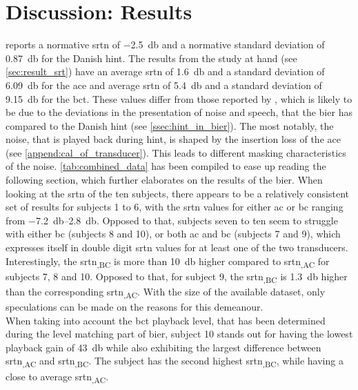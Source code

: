 \section{Discussion: Results}\label{sec:disc_res}
\citep{hint_2011} reports a normative \gls{srtn} of \SI{-2.5}{\decibel} and a normative standard deviation of \SI{0.87}{\decibel} for the Danish \gls{hint}. The results from the study at hand (see \autoref{sec:result_srt}) have an average \gls{srtn} of \SI{1.6}{\decibel} and a standard deviation of \SI{6.09}{\decibel} for the \gls{ace} and average \gls{srtn} of \SI{5.4}{\decibel} and a standard deviation of \SI{9.15}{\decibel} for the \gls{bct}.
These values differ from those reported by \citep{hint_2011}, which is likely to be due to the deviations in the presentation of noise and speech, that the \gls{bier} has compared to the Danish \gls{hint} (see \autoref{ssec:hint_in_bier}).
The most notably, the noise, that is played back during \gls{hint}, is shaped by the insertion loss of the \gls{ace} (see \autoref{append:cal_of_transducer}). This leads to different masking characteristics of the noise. 
\autoref{tab:combined_data} has been compiled to ease up reading the following section, which further elaborates on the results of the \gls{bier}.
When looking at the \gls{srtn} of the ten subjects, there appears to be a relatively consistent set of results for subjects 1 to 6, with the \gls{srtn} values for either \gls{ac} or \gls{bc} ranging from \SIrange{-7.2}{2.8}{\decibel}. 
Opposed to that, subjects seven to ten seem to struggle with either \gls{bc} (subjects 8 and 10), or both \gls{ac} and \gls{bc} (subjects 7 and 9), which expresses itself in double digit \gls{srtn} values for at least one of the two transducers. 
Interestingly, the \gls{srtn}\textsubscript{,BC} is more than \SI{10}{\decibel} higher compared to \gls{srtn}\textsubscript{,AC} for subjects 7, 8 and 10. Opposed to that, for subject 9, the \gls{srtn}\textsubscript{,BC} is \SI{1.3}{\decibel} higher than the corresponding \gls{srtn}\textsubscript{,AC}.
With the size of the available dataset, only speculations can be made on the reasons for this demeanour.\\
When taking into account the \gls{bct} playback level, that has been determined during the level matching part of \gls{bier}, subject 10 stands out for having the lowest playback gain of \SI{43}{\decibel} while also exhibiting the largest difference between \gls{srtn}\textsubscript{,AC} and \gls{srtn}\textsubscript{,BC}. 
The subject has the second highest \gls{srtn}\textsubscript{,BC}, while having a close to average \gls{srtn}\textsubscript{,AC}.
